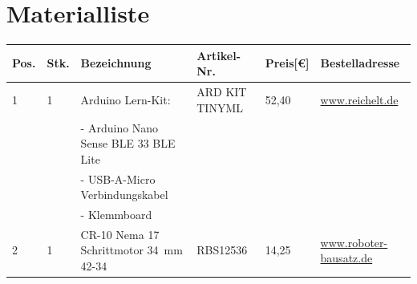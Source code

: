 \chapter{Materialliste}
\begin{center}
	\fontsize{8}{10}\selectfont
	\begin{tabularx}{\textwidth}{|p{0.4cm}|p{0.4cm}|X|X|p{1cm}|X|}
		\hline 
		\textbf{Pos.} & \textbf{Stk.} & \textbf{Bezeichnung} & \textbf{Artikel-Nr.} & \textbf{Preis[€]} & \textbf{Bestelladresse} \\ \hline
		1 & 1 & Arduino Lern-Kit: & ARD KIT TINYML & 52,40 & \href{https://www.reichelt.de}{www.reichelt.de} \\
		&   & - Arduino Nano Sense BLE 33 BLE Lite & & & \\ 
		&   &- USB-A-Micro Verbindungskabel & & & \\
		&   &- Klemmboard & & & \\
		\hline
		2 & 1 & CR-10 Nema 17 Schrittmotor 34\ mm 42-34 & RBS12536 & 14,25 & \href{https://www.roboter-bausatz.de/p/cr-10-nema-17-schrittmotor-34mm-42-34}{www.roboter-bausatz.de} \\
		\hline
		

\end{tabularx}
\end{center}
